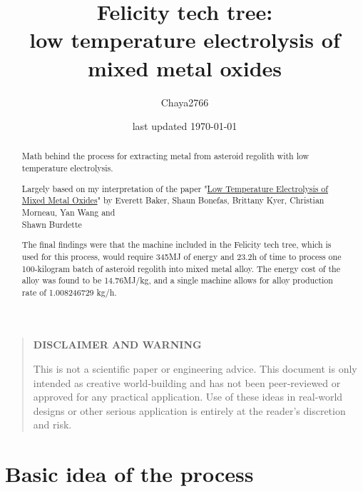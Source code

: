 \documentclass[a4paper]{article}
\title{Felicity tech tree:\\low temperature electrolysis of mixed metal oxides}
\author{Chaya2766}
\date{last updated \today}
\begin{document}
	\sffamily
	\hyphenchar{}
	\sloppy
	
	\maketitle
	
	\textbf{
		\sloppy
		\hyphenchar{}
		}
	
	\vfill
	
	\begin{abstract}
		Math behind the process for extracting metal from asteroid regolith with low temperature electrolysis.
		
		\medskip
		
		\noindent Largely based on my interpretation of the paper "\href{https://www.semanticscholar.org/paper/Low-Temperature-Electrolysis-of-Mixed-Metal-Oxides-Wang-Burdette/821a8dbb15a57500893ec3141e0e3cdd89e5f62c}{Low Temperature Electrolysis of Mixed Metal Oxides}" by Everett Baker, Shaun Bonefas, Brittany Kyer, Christian Morneau, Yan Wang and\\ Shawn Burdette
		
		\medskip
		
		The final findings were that the machine included in the Felicity tech tree, which is used for this process, would require 345MJ of energy and 23.2h of time to process one 100-kilogram batch of asteroid regolith into mixed metal alloy.
		The energy cost of the alloy was found to be 14.76MJ/kg, and a single machine allows for alloy production rate of 1.008246729 kg/h.
	\end{abstract}
	
	\vfill
	
	\begin{quote}
		\begin{center}
			\textbf{DISCLAIMER AND WARNING}
		\end{center}
		
		This is not a scientific paper or engineering advice.
		This document is only intended as creative world‑building and has not been peer‑reviewed or approved for any practical application.
		Use of these ideas in real‑world designs or other serious application is entirely at the reader’s discretion and risk.
	\end{quote}
	
	\vfill
	
	\tableofcontents
	
	\pagebreak
	
	\section{Basic idea of the process}
	
\end{document}
